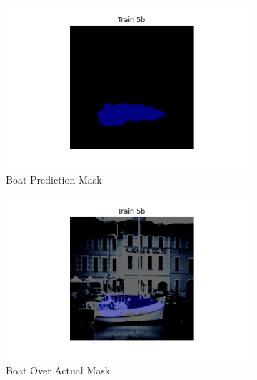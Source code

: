 \documentclass{article}
\begin{document}
\begin{figure}[h]
  \centering
  \begin{subfigure}[b]{0.45\textwidth}
      \centering
      \includegraphics[width=\textwidth]{include/best model/boat1_pred.png}
      \caption{Boat Prediction Mask}
  \end{subfigure}
  \hfill %
  \begin{subfigure}[b]{0.45\textwidth}
      \centering
      \includegraphics[width=\textwidth]{include/best model/boat1_over_actual.png} %
      \caption{Boat Over Actual Mask}
  \end{subfigure}
  \begin{subfigure}[b]{0.45\textwidth}
    \centering

\end{subfigure}
\end{figure}
\end{document}

